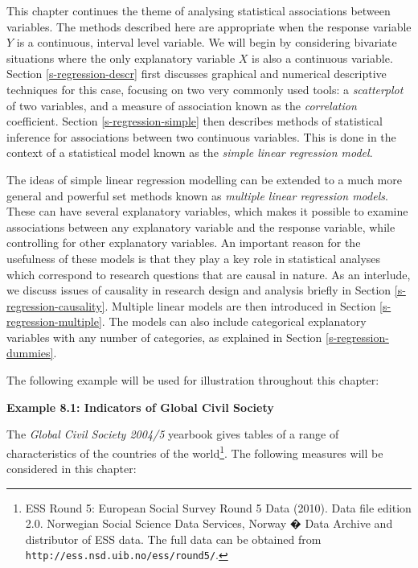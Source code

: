 \documentclass[11pt,a4paper,openany]{book}
\let\rmarkdownfootnote\footnote%
\def\footnote{\protect\rmarkdownfootnote}
\begin{document}
This chapter continues the theme of analysing statistical associations
between variables. The methods described here are appropriate when the
response variable \(Y\) is a continuous, interval level variable. We
will begin by considering bivariate situations where the only
explanatory variable \(X\) is also a continuous variable. Section
\ref{s-regression-descr} first discusses graphical and numerical
descriptive techniques for this case, focusing on two very commonly used
tools: a \emph{scatterplot} of two variables, and a measure of
association known as the \emph{correlation} coefficient. Section
\ref{s-regression-simple} then describes methods of statistical
inference for associations between two continuous variables. This is
done in the context of a statistical model known as the \emph{simple
linear regression model}.

The ideas of simple linear regression modelling can be extended to a
much more general and powerful set methods known as \emph{multiple
linear regression models}. These can have several explanatory variables,
which makes it possible to examine associations between any explanatory
variable and the response variable, while controlling for other
explanatory variables. An important reason for the usefulness of these
models is that they play a key role in statistical analyses which
correspond to research questions that are causal in nature. As an
interlude, we discuss issues of causality in research design and
analysis briefly in Section \ref{s-regression-causality}. Multiple
linear models are then introduced in Section
\ref{s-regression-multiple}. The models can also include categorical
explanatory variables with any number of categories, as explained in
Section \ref{s-regression-dummies}.

The following example will be used for illustration throughout this
chapter:

\textbf{Example 8.1: Indicators of Global Civil Society}

The \emph{Global Civil Society 2004/5} yearbook gives tables of a range
of characteristics of the countries of the world\footnote{ESS Round 5:
  European Social Survey Round 5 Data (2010). Data file edition 2.0.
  Norwegian Social Science Data Services, Norway � Data Archive and
  distributor of ESS data. The full data can be obtained from
  \texttt{http://ess.nsd.uib.no/ess/round5/}.}. The following measures
will be considered in this chapter:
\end{document}
